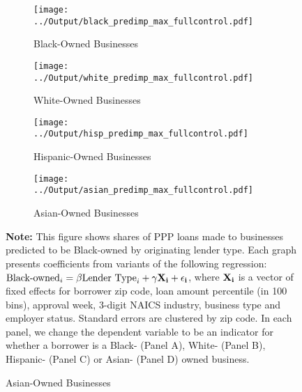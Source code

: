 \documentclass[11pt]{article}
\begin{document}
\newpage
\begin{figure}[H]
	\caption{\textbf{Conditional Share of PPP Loans to Each Race by Institution Type}} \label{f:race_controls}

	\begin{adjustbox}{width=1.05\linewidth, center}
		\begin{subfigure}{0.5\linewidth}
			\caption{Black-Owned Businesses}
			\centering
			\texttt{[image: ../Output/black\_predimp\_max\_fullcontrol.pdf]}
		\end{subfigure}
		\begin{subfigure}{0.5\linewidth}
			\caption{White-Owned Businesses}
			\centering
			\texttt{[image: ../Output/white\_predimp\_max\_fullcontrol.pdf]}
		\end{subfigure}
	\end{adjustbox}
	\vspace{0.5cm}

	\begin{adjustbox}{width=1.05\linewidth, center}
		\begin{subfigure}{0.5\linewidth}
			\caption{Hispanic-Owned Businesses}
			\centering
			\texttt{[image: ../Output/hisp\_predimp\_max\_fullcontrol.pdf]}
		\end{subfigure}
		\begin{subfigure}{0.5\linewidth}
			\caption{Asian-Owned Businesses}
			\centering
			\texttt{[image: ../Output/asian\_predimp\_max\_fullcontrol.pdf]}
		\end{subfigure}
	\end{adjustbox}

	\begin{minipage}{\textwidth} \medskip
		\footnotesize{{\bf Note: }This figure shows shares of PPP loans made to businesses predicted to be Black-owned by originating lender type. Each graph presents coefficients from variants of the following regression: $\mbox{Black-owned}_i = \beta \mbox{Lender Type}_i + \gamma \bf{X}_i + \epsilon_i$, where $\bf{X}_i$ is a vector of fixed effects for borrower zip code, loan amount percentile (in 100 bins), approval week, 3-digit NAICS industry, business type and employer status. Standard errors are clustered by zip code. In each panel, we change the dependent variable to be an indicator for whether a borrower is a Black- (Panel A), White- (Panel B), Hispanic- (Panel C) or Asian- (Panel D) owned business.}
	\end{minipage}
\end{figure}
\end{document}

